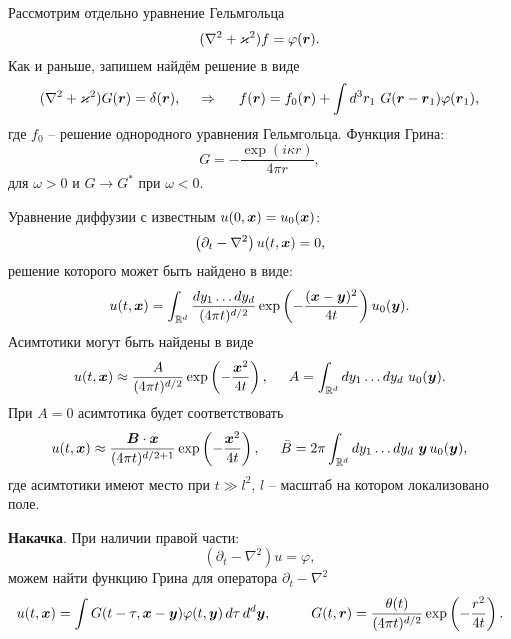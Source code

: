 Рассмотрим отдельно уравнение Гельмгольца
\begin{equation*}
    (\nabla^2 + \varkappa^2) f = \varphi(\mbox{\boldmath $r$}).
\end{equation*}
Как и раньше, запишем найдём решение в виде
\begin{equation*}
    (\nabla^2 + \varkappa^2) G(\mbox{\boldmath $r$}) = \delta(\mbox{\boldmath $r$}),
    \hspace{0.5cm} \Rightarrow \hspace{0.5cm}
    f(\mbox{\boldmath $r$}) = f_0(\mbox{\boldmath $r$}) + \int d^3 r_1 \ G(\mbox{\boldmath $r$}-\mbox{\boldmath $r$}_1) \varphi(\mbox{\boldmath $r$}_1),
\end{equation*}
где $f_0$ -- решение однородного уравнения Гельмгольца.
Функция Грина:
\begin{equation*}
    G = - \frac{\exp(i \kappa r)}{4 \pi r},
\end{equation*}
для $\omega > 0$ и $G \to G^*$ при $\omega < 0$.





Уравнение диффузии с известным $u(0, \mbox{\boldmath $x$}) = u_0 (\mbox{\boldmath $x$})$:
\begin{equation}
    \left(\partial_t - \nabla^2\right) u(t, \mbox{\boldmath $x$}) = 0,
    \label{difeq}
\end{equation}
решение которого может быть найдено в виде:
\begin{equation}
    u(t, \mbox{\boldmath $x$}) = \int_{\mathbb{R}^d} \frac{d y_1 \ldots d y_d}{(4 \pi t)^{d/2}} \exp\left(- \frac{(\mbox{\boldmath $x$}-\mbox{\boldmath $y$})^2}{4 t}\right) u_0(\mbox{\boldmath $y$}).
    \label{difsol}
\end{equation}
Асимтотики могут быть найдены в виде
\begin{equation}
    u(t, \mbox{\boldmath $x$}) \approx \frac{A}{(4 \pi t)^{d/2}} \exp\left(- \frac{\mbox{\boldmath $x$}^2}{4 t}\right),
    \hspace{5 mm} 
    A = \int_{ \mathbb{R}^d} dy_1 \ldots dy_d \ u_0(\mbox{\boldmath $y$}).
    \label{difas1}
\end{equation}
При $A = 0$ асимтотика будет соответствовать
\begin{equation}
    u(t, \mbox{\boldmath $x$}) \approx  \frac{\mbox{\boldmath $B$} \cdot \mbox{\boldmath $x$}}{(4 \pi t)^{d/2+1}} \exp\left(
        - \frac{\mbox{\boldmath $x$}^2}{4 t}
    \right), \hspace{5 mm} 
    \bar{B} = 2 \pi \int_{ \mathbb{R}^d} dy_1 \ldots dy_d \ \mbox{\boldmath $y$}\, u_0(\mbox{\boldmath $y$}),
    \label{difas2}
\end{equation}
где асимтотики имеют место при $t \gg l^2$, $l$ -- масштаб на котором локализовано поле.

\textbf{Накачка}. 
При наличии правой части:
\begin{equation*}
    (\partial_t - \nabla^2) u = \varphi,
\end{equation*}
можем найти функцию Грина для оператора $\partial_t - \nabla^2$
\begin{equation*}
    u(t, \vc{x}) =  \int G(t-\tau, \vc{x}-\vc{y}) \varphi(t, \vc{y}) \d \tau \d^d \vc{y},
    \hspace{10 mm} 
    G(t, \vc{r}) = \frac{\theta(t)}{(4 \pi t)^{d/2}} \exp\left(- \frac{r^2}{4 t}\right).
\end{equation*}

